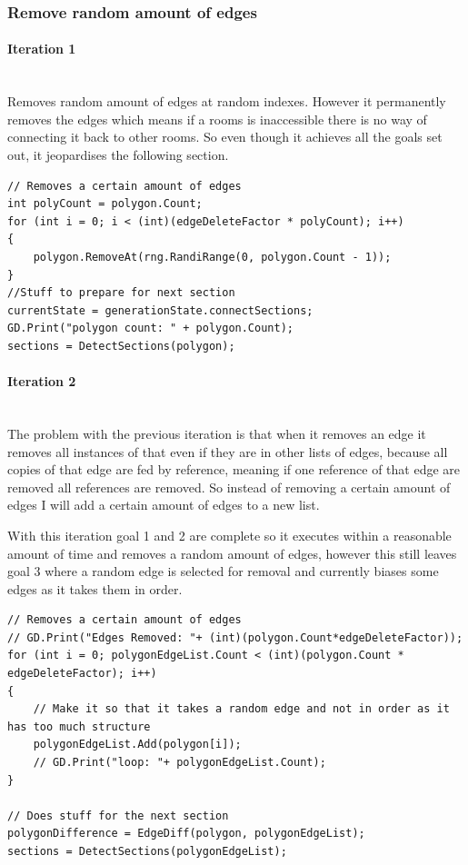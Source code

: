 \documentclass{article}
\newcommand{\parBr}{\vspace{5mm}}%
\newcommand{\myparagraph}[1]{\paragraph{#1}\mbox{}\\} %
\begin{document}
\subsubsection{Remove random amount of edges}
\myparagraph{Iteration 1}
Removes random amount of edges at random indexes. However it permanently removes the edges which means if a rooms is inaccessible there is no way of connecting it back to other rooms. So even though it achieves all the goals set out, it jeopardises the following section.
\begin{lstlisting}
// Removes a certain amount of edges
int polyCount = polygon.Count;
for (int i = 0; i < (int)(edgeDeleteFactor * polyCount); i++)
{
    polygon.RemoveAt(rng.RandiRange(0, polygon.Count - 1));
}
//Stuff to prepare for next section
currentState = generationState.connectSections;
GD.Print("polygon count: " + polygon.Count);
sections = DetectSections(polygon);
\end{lstlisting}

\myparagraph{Iteration 2}
The problem with the previous iteration is that when it removes an edge it removes all instances of that even if they are in other lists of edges, because all copies of that edge are fed by reference, meaning if one reference of that edge are removed all references are removed. So instead of removing a certain amount of edges I will add a certain amount of edges to a new list.

\parBr

With this iteration goal 1 and 2 are complete so it executes within a reasonable amount of time and removes a random amount of edges, however this still leaves goal 3 where a random edge is selected for removal and currently biases some edges as it takes them in order.
\begin{lstlisting}
// Removes a certain amount of edges
// GD.Print("Edges Removed: "+ (int)(polygon.Count*edgeDeleteFactor));
for (int i = 0; polygonEdgeList.Count < (int)(polygon.Count * edgeDeleteFactor); i++)
{
    // Make it so that it takes a random edge and not in order as it has too much structure
    polygonEdgeList.Add(polygon[i]);
    // GD.Print("loop: "+ polygonEdgeList.Count);
}

// Does stuff for the next section
polygonDifference = EdgeDiff(polygon, polygonEdgeList);
sections = DetectSections(polygonEdgeList);
\end{lstlisting}
\end{document}

